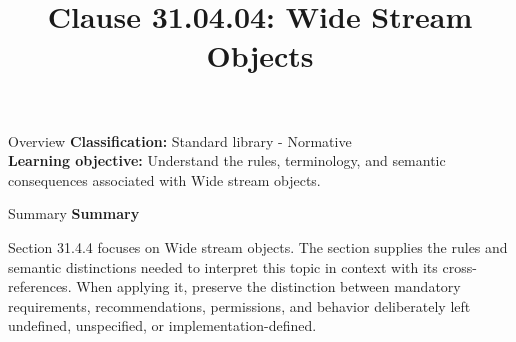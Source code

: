 \documentclass[10pt,letterpaper]{article}
\title{Clause 31.04.04: Wide Stream Objects}
\author{}
\date{}
\begin{document}
\maketitle
\begin{CornellOverviewBox}{Overview}
\textbf{Classification:} Standard library - Normative\\[2pt]
\textbf{Learning objective:} Understand the rules, terminology, and semantic consequences associated with Wide stream objects.
\end{CornellOverviewBox}\begin{CornellSummaryBox}{Summary}
{\sffamily\bfseries\color{Accent} Summary}\par\vspace{3pt}Section 31.4.4 focuses on Wide stream objects. The section supplies the rules and semantic distinctions needed to interpret this topic in context with its cross-references. When applying it, preserve the distinction between mandatory requirements, recommendations, permissions, and behavior deliberately left undefined, unspecified, or implementation-defined.
\end{CornellSummaryBox}
\end{document}
